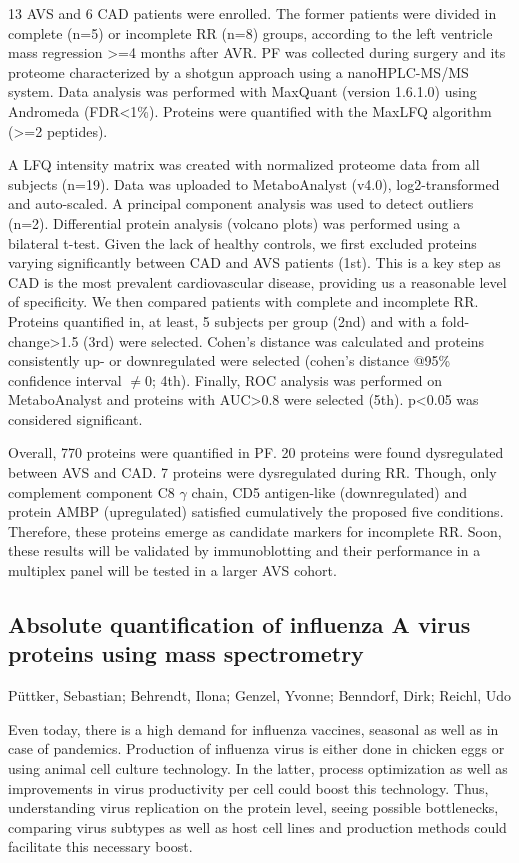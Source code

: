 {13 AVS and 6 CAD patients were enrolled. The former patients were divided in complete (n=5) or incomplete RR (n=8) groups, according to the left ventricle mass regression >=4 months after AVR. PF was collected during surgery and its proteome characterized by a shotgun approach using a nanoHPLC-MS/MS system. Data analysis was performed with MaxQuant (version 1.6.1.0) using Andromeda (FDR<1\%). Proteins were quantified with the MaxLFQ algorithm (>=2 peptides).

A LFQ intensity matrix was created with normalized proteome data from all subjects (n=19). Data was uploaded to MetaboAnalyst (v4.0), log2-transformed and auto-scaled. A principal component analysis was used to detect outliers (n=2). Differential protein analysis (volcano plots) was performed using a bilateral t-test. Given the lack of healthy controls, we first excluded proteins varying significantly between CAD and AVS patients (1st). This is a key step as CAD is the most prevalent cardiovascular disease, providing us a reasonable level of specificity. We then compared patients with complete and incomplete RR. Proteins quantified in, at least, 5 subjects per group (2nd) and with a fold-change>1.5 (3rd) were selected. Cohen’s distance was calculated and proteins consistently up- or downregulated were selected (cohen’s distance @95\% confidence interval $\neq$0; 4th). Finally, ROC analysis was performed on MetaboAnalyst and proteins with AUC>0.8 were selected (5th). p<0.05 was considered significant.

Overall, 770 proteins were quantified in PF. 20 proteins were found dysregulated between AVS and CAD. 7 proteins were dysregulated during RR. Though, only complement component C8 $\gamma$ chain, CD5 antigen-like (downregulated) and protein AMBP (upregulated) satisfied cumulatively the proposed five conditions. Therefore, these proteins emerge as candidate markers for incomplete RR. Soon, these results will be validated by immunoblotting and their performance in a multiplex panel will be tested in a larger AVS cohort. 


\subsection*{\color{eubicRed} Absolute quantification of influenza A virus proteins using mass spectrometry}
{\color{eubicGray}Püttker, Sebastian;
Behrendt, Ilona;
Genzel, Yvonne;
Benndorf, Dirk;
Reichl, Udo}

Even today, there is a high demand for influenza vaccines, seasonal as well as in case of pandemics. Production of influenza virus is either done in chicken eggs or using animal cell culture technology. In the latter, process optimization as well as improvements in virus productivity per cell could boost this technology. Thus, understanding virus replication on the protein level, seeing possible bottlenecks, comparing virus subtypes as well as host cell lines and production methods could facilitate this necessary boost.

}
